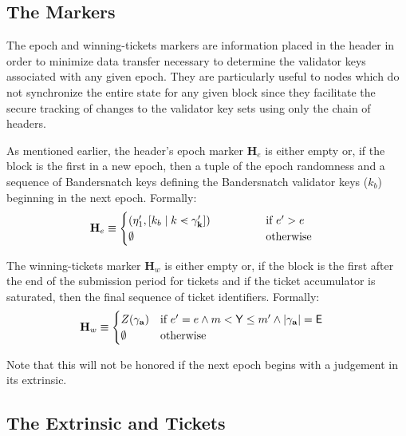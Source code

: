 \subsection{The Markers}\label{sec:epochmarker}

The epoch and winning-tickets markers are information placed in the header in order to minimize data transfer necessary to determine the validator keys associated with any given epoch. They are particularly useful to nodes which do not synchronize the entire state for any given block since they facilitate the secure tracking of changes to the validator key sets using only the chain of headers.

As mentioned earlier, the header's epoch marker $\mathbf{H}_e$ is either empty or, if the block is the first in a new epoch, then a tuple of the epoch randomness and a sequence of Bandersnatch keys defining the Bandersnatch validator keys ($k_b$) beginning in the next epoch. Formally:
\begin{align}\label{eq:epochmarker}
  \mathbf{H}_e &\equiv \begin{cases}
    ( \eta'_1, [ k_b \mid k \orderedin \gamma'_\mathbf{k} ] )\qquad\qquad &\when e' > e \\
    \none & \otherwise
  \end{cases}
\end{align}

The winning-tickets marker $\mathbf{H}_w$ is either empty or, if the block is the first after the end of the submission period for tickets and if the ticket accumulator is saturated, then the final sequence of ticket identifiers. Formally:
\begin{align}\label{eq:winningticketsmarker}
  \mathbf{H}_w &\equiv \begin{cases}
    Z(\gamma_\mathbf{a}) &\text{if } e' = e \wedge m < \mathsf{Y} \le m' \wedge |\gamma_\mathbf{a}| = \mathsf{E} \\
    \emptyset & \text{otherwise}
  \end{cases}
\end{align}

 Note that this will not be honored if the next epoch begins with a judgement in its extrinsic.














\subsection{The Extrinsic and Tickets}

